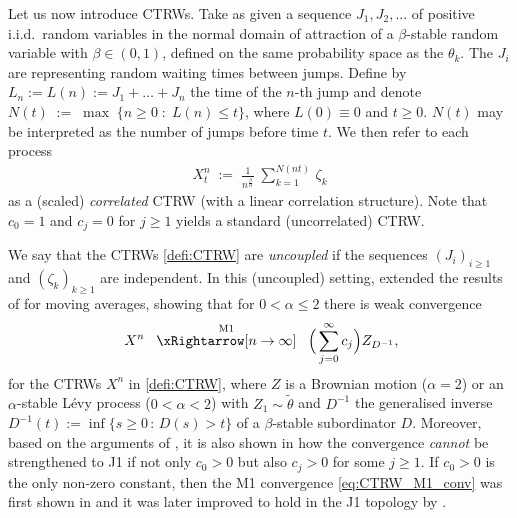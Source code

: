 \documentclass[11pt]{article}
\theoremstyle{definition}\newtheorem{example}[theorem]{Example}
\theoremstyle{definition}\newtheorem{counterexample}[theorem]{Counterexample}
\theoremstyle{definition}\newtheorem{remark}[theorem]{Remark}
\theoremstyle{definition}\newtheorem{defi}[theorem]{Definition}
\numberwithin{equation}{section}
\newcommand{\convw}[1]{\xRightarrow[ {#1}]{}}							%
\renewcommand{\max}[1]{\underset{#1}{\operatorname{max}}\;}				%
\renewcommand{\|}{\; : \, \;}											%
\begin{document}
Let us now introduce CTRWs. Take as given a sequence $J_1, J_2,...$ of positive i.i.d.~random variables in the normal domain of attraction of a $\beta$-stable random variable with $\beta \in (0,1)$, defined on the same probability space as the $\theta_k$. The $J_i$ are representing random waiting times between jumps. Define by $L_n:=L(n):= J_1+\hdots+J_n$ the time of the $n$-th jump and denote 
$ N(t) \; := \; \max{} \{ n \ge 0 \; : \; L(n) \le t \}$,
where $L(0)\equiv 0$ and $t\ge 0$. $N(t)$ may be interpreted as the number of jumps before time $t$. We then refer to each process
\begin{align} X^n_t \; := \;  \frac{1}{n^{\frac \beta \alpha}} \; \sum_{k=1}^{N(nt)} \, \zeta_k \label{defi:CTRW}
\end{align}
as a (scaled) \emph{correlated} CTRW (with a linear correlation structure). Note that $c_0=1$ and $c_j=0$ for $j\geq1$ yields a standard (uncorrelated) CTRW.


We say that the CTRWs \eqref{defi:CTRW} are \emph{uncoupled} if the sequences $(J_i)_{i\geq 1}$ and $(\zeta_k)_{k\geq 1}$ are independent. In this (uncoupled) setting, \cite{meerschaert2} extended the results of \cite{avram} for moving averages, showing that for $0<\alpha\le 2$ there is weak convergence
\begin{equation}\label{eq:CTRW_M1_conv}
	\; X^n \; \; \stackrel{\text{M1}}{\convw{n\to \infty}} \; \; \Bigl(\,\sum_{j=0}^\infty c_j\Bigr)Z_{D^{-1}},
\end{equation}
for the CTRWs $X^n$ in \eqref{defi:CTRW}, where $Z$ is a Brownian motion ($\alpha=2$) or an $\alpha$-stable Lévy process ($0<\alpha<2$) with $Z_1\sim \tilde \theta$ and $D^{-1}$ the generalised inverse 
$ D^{-1}(t)  := \operatorname{inf}  \{  s\ge 0 \, : \, D(s)  >  t \}$ of a $\beta$-stable subordinator $D$. Moreover, based on the arguments of \cite{avram}, it is also shown in \cite{meerschaert2} how the convergence \emph{cannot} be strengthened to J1 if not only $c_0>0$ but also $c_j>0$ for some $j\ge 1$. If $c_0>0$ is the only non-zero constant, then the M1 convergence \eqref{eq:CTRW_M1_conv} was first shown in \cite{Becker-Kern} and it was later improved to hold in the J1 topology by \cite{henry_straka}. 
\end{document}
